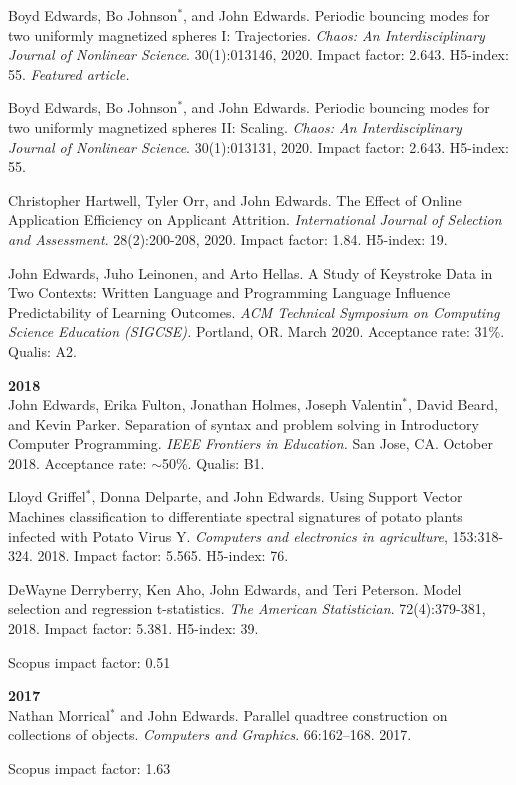 \documentclass[margin,line]{res}
\newcommand{\pubunder}[1]{#1}
\newcommand{\pnum}[1]{}
\begin{document}
\begin{resume}
\pnum{22} Boyd Edwards, Bo Johnson$^*$, and \pubunder{John Edwards}. Periodic bouncing modes for two uniformly magnetized spheres I: Trajectories. \textit{Chaos: An Interdisciplinary Journal of Nonlinear Science}. 30(1):013146, 2020. Impact factor: 2.643. H5-index: 55. \textit{Featured article.}

\pnum{21} Boyd Edwards, Bo Johnson$^*$, and \pubunder{John Edwards}. Periodic bouncing modes for two uniformly magnetized spheres II: Scaling. \textit{Chaos: An Interdisciplinary Journal of Nonlinear Science}. 30(1):013131, 2020. Impact factor: 2.643. H5-index: 55. 

\pnum{20} Christopher Hartwell, Tyler Orr, and \pubunder{John Edwards}. The Effect of Online Application Efficiency on Applicant Attrition. \textit{International Journal of Selection and Assessment}. 28(2):200-208, 2020. Impact factor: 1.84. H5-index: 19.

\pnum{19} John Edwards, Juho Leinonen, and Arto Hellas. A Study of Keystroke Data in Two Contexts: Written Language and Programming Language Influence Predictability of Learning Outcomes.  \textit{ACM Technical Symposium on Computing Science Education (SIGCSE).} Portland, OR. March 2020.  Acceptance rate: 31\%. Qualis: A2.

\textbf{2018} \\
\pnum{18} John Edwards, Erika Fulton, Jonathan Holmes, Joseph Valentin$^*$, David Beard, and Kevin Parker. Separation of syntax and problem solving in Introductory Computer Programming. \textit{IEEE Frontiers in Education.} San Jose, CA. October 2018.  Acceptance rate: $\sim$50\%. Qualis: B1.

\pnum{17} Lloyd Griffel$^*$, Donna Delparte, and John Edwards. Using Support Vector Machines classification to differentiate spectral signatures of potato plants infected with Potato Virus Y. \textit{Computers and electronics in agriculture}, 153:318-324. 2018. Impact factor: 5.565. H5-index: 76.

\pnum{16} DeWayne Derryberry, Ken Aho, \pubunder{John Edwards}, and Teri Peterson. Model selection and regression t-statistics. \textit{The American Statistician}. 72(4):379-381, 2018. Impact factor: 5.381. H5-index: 39.
\begin{IMPACT}
Scopus impact factor: 0.51 %
\end{IMPACT}

\textbf{2017} \\
\pnum{15} Nathan Morrical$^*$ and \pubunder{John Edwards}. Parallel quadtree construction on collections of objects. \textit{Computers and Graphics}. 66:162–168. 2017.
\begin{IMPACT}
Scopus impact factor: 1.63 %
\end{IMPACT}


\end{resume}
\end{document}
